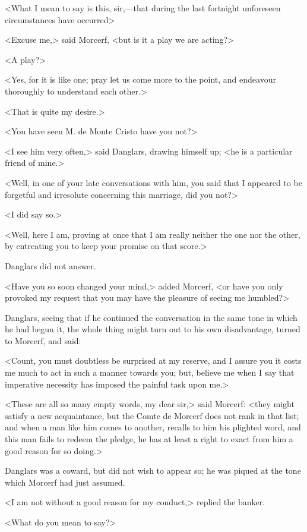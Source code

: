  <What I mean to say is this, sir,—that during the last fortnight unforeseen circumstances have occurred\longdash> 

 <Excuse me,> said Morcerf, <but is it a play we are acting?> 

 <A play?> 

 <Yes, for it is like one; pray let us come more to the point, and endeavour thoroughly to understand each other.> 

 <That is quite my desire.> 

 <You have seen M. de Monte Cristo have you not?> 

 <I see him very often,> said Danglars, drawing himself up; <he is a particular friend of mine.> 

 <Well, in one of your late conversations with him, you said that I appeared to be forgetful and irresolute concerning this marriage, did you not?> 

 <I did say so.> 

 <Well, here I am, proving at once that I am really neither the one nor the other, by entreating you to keep your promise on that score.> 

 Danglars did not answer. 

 <Have you so soon changed your mind,> added Morcerf, <or have you only provoked my request that you may have the pleasure of seeing me humbled?> 

 Danglars, seeing that if he continued the conversation in the same tone in which he had begun it, the whole thing might turn out to his own disadvantage, turned to Morcerf, and said: 

 <Count, you must doubtless be surprised at my reserve, and I assure you it costs me much to act in such a manner towards you; but, believe me when I say that imperative necessity has imposed the painful task upon me.> 

 <These are all so many empty words, my dear sir,> said Morcerf: <they might satisfy a new acquaintance, but the Comte de Morcerf does not rank in that list; and when a man like him comes to another, recalls to him his plighted word, and this man fails to redeem the pledge, he has at least a right to exact from him a good reason for so doing.> 

 Danglars was a coward, but did not wish to appear so; he was piqued at the tone which Morcerf had just assumed. 

 <I am not without a good reason for my conduct,> replied the banker. 

 <What do you mean to say?> 


